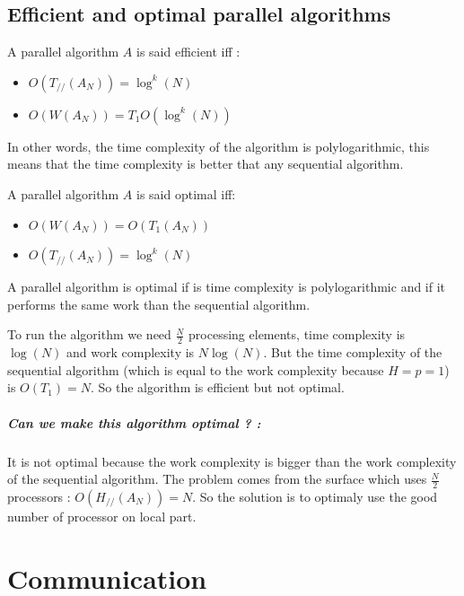 \documentclass[11pt,a4paper]{report}
\begin{document}
\section{Efficient and optimal parallel algorithms} %
\label{sec:Efficient and optimal parallel algorithms}

A parallel algorithm $A$ is said efficient iff :
\begin{itemize}
    \item $O(T_{//}(A_N)) = \log^k(N)$
    \item $O(W(A_N)) = T_1 O(\log^k(N))$
\end{itemize}

In other words, the time complexity of the algorithm is polylogarithmic, this means that the time complexity is better that any sequential algorithm.

A parallel algorithm $A$ is said optimal iff:
\begin{itemize}
    \item $O(W(A_N)) = O(T_1(A_N))$
    \item $O(T_{//}(A_N)) = \log^k(N)$
\end{itemize}

A parallel algorithm is optimal if is time complexity is polylogarithmic and if it performs the same work than the sequential algorithm.

To run the algorithm we need $\frac{N}{2}$ processing elements, time complexity is $\log(N)$ and work complexity is $N\log(N)$. But the time complexity of the sequential algorithm (which is equal to the work complexity because $H=p=1$) is $O(T_1) = N$. So the algorithm is efficient but not optimal.

\paragraph*{Can we make this algorithm optimal ? :}

It is not optimal because the work complexity is bigger than the work complexity of the sequential algorithm. The problem comes from the surface which uses $\frac{N}{2}$ processors : $O(H_{//}(A_N)) = N$. So the solution is to optimaly use the good number of processor on local part.



\chapter{Communication} %
\label{cha:Communication}
\end{document}
